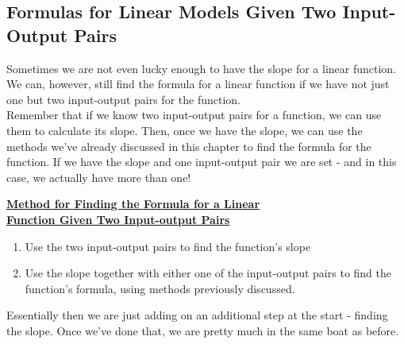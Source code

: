 %
%

\subsection{Formulas for Linear Models Given Two Input-Output Pairs}

Sometimes we are not even lucky enough to have the slope for a linear function. We can, however, still find the formula for a linear function if we have not just one but two input-output pairs for the function.\\

Remember that if we know two input-output pairs for a function, we can use them to calculate its slope. Then, once we have the slope, we can use the methods we’ve already discussed in this chapter to find the formula for the function. If we have the slope and one input-output pair we are set - and in this case, we actually have more than one!

\begin{definition}
	\textbf{\underline{Method for Finding the Formula for a Linear}}\\
	 \textbf\underline{{Function Given Two Input-output Pairs}}
	\begin{enumerate}
		\item Use the two input-output pairs to find the function’s slope
		\item Use the slope together with either one of the input-output pairs to find the function’s formula, using methods previously discussed.
	\end{enumerate}
\end{definition}

Essentially then we are just adding on an additional step at the start - finding the slope. Once we’ve done that, we are pretty much in the same boat as before.



